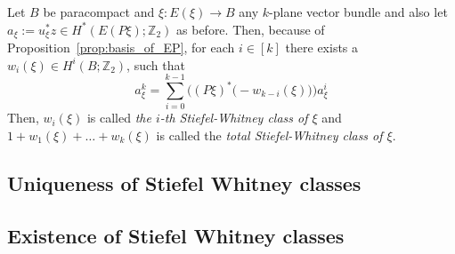 \begin{definition} Let $B$ be paracompact and $\xi:E(\xi)\to B$ any $k$-plane vector bundle and also let $a_{\xi}:=u_{\xi}^*z\in H^*(E(P\xi);\mathbb{Z}_2)$ as before. Then, because of Proposition~\ref{prop:basis_of_EP}, for each $i\in[k]$ there exists a $w_i(\xi)\in H^i(B;\mathbb{Z}_2)$, such that
\[a_{\xi}^k=\sum_{i=0}^{k-1}\Big((P\xi)^*\big(-w_{k-i}(\xi)\big)\Big)a_{\xi}^i\]
Then, $w_i(\xi)$ is called \emph{the $i$-th Stiefel-Whitney class of $\xi$} and $1+w_1(\xi)+\ldots+w_k(\xi)$ is called the \emph{total Stiefel-Whitney class of $\xi$}.
\end{definition}
\subsection{Uniqueness of Stiefel Whitney classes}

\subsection{Existence of Stiefel Whitney classes}




